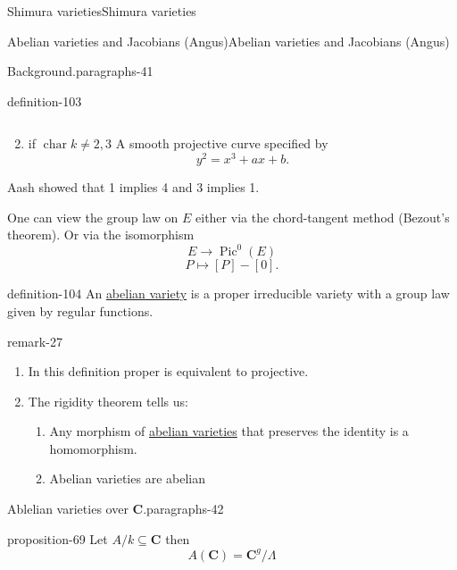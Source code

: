 \documentclass[10pt,]{book}
\numberwithin{equation}{section}
\newcommand{\CC}{\mathbf{C}}
\DeclareMathOperator{\Pic}{Pic}
\DeclareMathOperator{\characteristic}{char}
\begin{document}
\begin{chapterptx}{Shimura varieties}{}{Shimura varieties}{}{}
\begin{sectionptx}{Abelian varieties and Jacobians (Angus)}{}{Abelian varieties and Jacobians (Angus)}{}{}
\begin{paragraphs}{Background.}{paragraphs-41}
\begin{definition}{}{definition-103}
\begin{enumerate}
\begin{equation*}
\end{equation*}
%
\item\hypertarget{li-273}{}if \(\characteristic k \ne 2,3\) A smooth projective curve specified by%
\begin{equation*}
y^2=  x^3+ ax + b\text{.}
\end{equation*}
%
\end{enumerate}
%
\end{definition}
\hypertarget{p-1090}{}%
Aash showed that 1 implies 4 and 3 implies 1.%
\par
\hypertarget{p-1091}{}%
One can view the group law on \(E\) either via the chord-tangent method (Bezout's theorem). Or via the isomorphism%
\begin{equation*}
E \to \Pic^0(E)
\end{equation*}
%
\begin{equation*}
P \mapsto [P] - [0]\text{.}
\end{equation*}
%
\begin{definition}{}{definition-104}%
\hypertarget{p-1092}{}%
An \hyperref[def-buntes-abvar]{abelian variety} is a proper irreducible variety with a group law given by regular functions.%
\end{definition}
\begin{remark}{}{remark-27}%
\hypertarget{p-1093}{}%
\leavevmode%
\begin{enumerate}
\item\hypertarget{li-274}{}In this definition proper is equivalent to projective.%
\item\hypertarget{li-275}{}\hypertarget{p-1094}{}%
The rigidity theorem tells us:%
\begin{enumerate}
\item\hypertarget{li-276}{}Any morphism of \hyperref[def-buntes-abvar]{abelian varieties} that preserves the identity is a homomorphism.%
\item\hypertarget{li-277}{}Abelian varieties are abelian%
\end{enumerate}
%
\end{enumerate}
%
\end{remark}
\end{paragraphs}%
\begin{paragraphs}{Ablelian varieties over \(\CC\).}{paragraphs-42}%
\begin{proposition}{}{}{proposition-69}%
\hypertarget{p-1095}{}%
Let \(A/k\subseteq \CC\) then%
\begin{equation*}
A(\CC) = \CC^g/\Lambda
\end{equation*}

\end{proposition}
\end{paragraphs}
\end{sectionptx}
\end{chapterptx}
\end{document}
